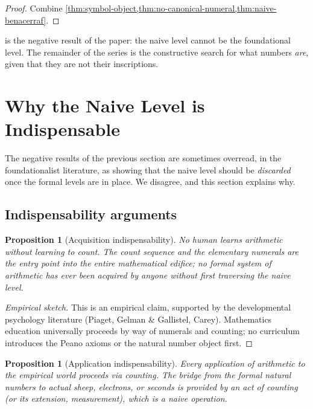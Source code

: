 \documentclass[12pt]{article}
\newtheorem{proposition}[theorem]{Proposition}
\theoremstyle{definition}
\theoremstyle{remark}
\begin{document}
\begin{proof}
Combine \cref{thm:symbol-object,thm:no-canonical-numeral,thm:naive-benacerraf}.
\end{proof}

 is the negative result of the paper: the
naive level cannot be the foundational level. The remainder of the
series is the constructive search for what numbers \emph{are}, given
that they are not their inscriptions.

\section{Why the Naive Level is Indispensable}
\label{sec:indispensable}

The negative results of the previous section are sometimes overread, in
the foundationalist literature, as showing that the naive level should be
\emph{discarded} once the formal levels are in place. We disagree, and
this section explains why.

\subsection{Indispensability arguments}

\begin{proposition}[Acquisition indispensability]
\label{prop:acquisition}
No human learns arithmetic without learning to count. The count sequence
and the elementary numerals are the entry point into the entire
mathematical edifice; no formal system of arithmetic has ever been
acquired by anyone without first traversing the naive level.
\end{proposition}

\begin{proof}[Empirical sketch]
This is an empirical claim, supported by the developmental psychology
literature (Piaget, Gelman \& Gallistel, Carey). Mathematics education
universally proceeds by way of numerals and counting; no curriculum
introduces the Peano axioms or the natural number object first.
\end{proof}

\begin{proposition}[Application indispensability]
\label{prop:application}
Every application of arithmetic to the empirical world proceeds via
counting. The bridge from the formal natural numbers to actual sheep,
electrons, or seconds is provided by an act of counting (or its
extension, measurement), which is a naive operation.
\end{proposition}
\end{document}
